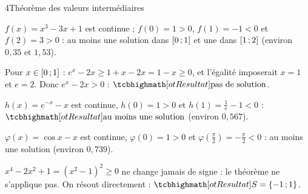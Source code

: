 \begin{deuxcolonnes}
\begin{corrige}{4}{Théorème des valeurs intermédiaires}
\begin{questions}
  \item $f(x)=x^{3}-3x+1$ est continue ; $f(0)=1>0$, $f(1)=-1<0$ et $f(2)=3>0$ : au moins une solution dans
    $\mathopen{[}0\,{;}\,1\mathclose{]}$ et une dans $\mathopen{[}1\,{;}\,2\mathclose{]}$ (environ $0{,}35$ et $1{,}53$).
  \item Pour $x\in\mathopen{[}0\,{;}\,1\mathclose{]}$ : $e^{x}-2x\geq1+x-2x=1-x\geq0$, et l'égalité imposerait $x=1$ et $e=2$.
    Donc $e^{x}-2x>0$ : $\res{\text{pas de solution}}$.
  \item $h(x)=e^{-x}-x$ est continue, $h(0)=1>0$ et $h(1)=\frac1e-1<0$ : $\res{\text{au moins une solution}}$ (environ $0{,}567$).
  \item $\varphi(x)=\cos x-x$ est continue, $\varphi(0)=1>0$ et $\varphi\left(\frac\pi2\right)=-\frac\pi2<0$ : au moins une solution
    (environ $0{,}739$).
  \item $x^{4}-2x^{2}+1=\left(x^{2}-1\right)^{2}\geq0$ ne change jamais de signe : le théorème ne s'applique pas.
    On résout directement : $\res{S=\ens{-1\pv1}}$.
\end{questions}
\end{corrige}

\end{deuxcolonnes}


